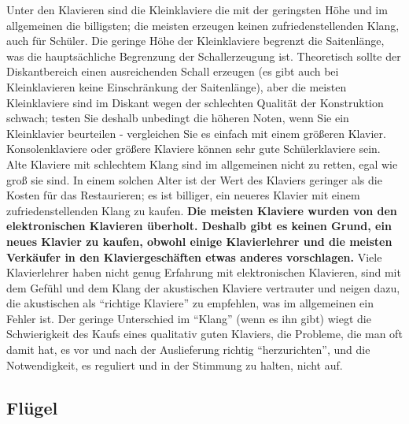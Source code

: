 Unter den Klavieren sind die Kleinklaviere die mit der geringsten Höhe und im allgemeinen die billigsten; die meisten erzeugen keinen zufriedenstellenden Klang, auch für Schüler.
Die geringe Höhe der Kleinklaviere begrenzt die Saitenlänge, was die hauptsächliche Begrenzung der Schallerzeugung ist.
Theoretisch sollte der Diskantbereich einen ausreichenden Schall erzeugen (es gibt auch bei Kleinklavieren keine Einschränkung der Saitenlänge), aber die meisten Kleinklaviere sind im Diskant wegen der schlechten Qualität der Konstruktion schwach; testen Sie deshalb unbedingt die höheren Noten, wenn Sie ein Kleinklavier beurteilen - vergleichen Sie es einfach mit einem größeren Klavier.
Konsolenklaviere oder größere Klaviere können sehr gute Schülerklaviere sein.
Alte Klaviere mit schlechtem Klang sind im allgemeinen nicht zu retten, egal wie groß sie sind.
In einem solchen Alter ist der Wert des Klaviers geringer als die Kosten für das Restaurieren; es ist billiger, ein neueres Klavier mit einem zufriedenstellenden Klang zu kaufen.
\textbf{Die meisten Klaviere wurden von den elektronischen Klavieren überholt.
Deshalb gibt es keinen Grund, ein neues Klavier zu kaufen, obwohl einige Klavierlehrer und die meisten Verkäufer in den Klaviergeschäften etwas anderes vorschlagen.}
Viele Klavierlehrer haben nicht genug Erfahrung mit elektronischen Klavieren, sind mit dem Gefühl und dem Klang der akustischen Klaviere vertrauter und neigen dazu, die akustischen als \enquote{richtige Klaviere} zu empfehlen, was im allgemeinen ein Fehler ist.
Der geringe Unterschied im \enquote{Klang} (wenn es ihn gibt) wiegt die Schwierigkeit des Kaufs eines qualitativ guten Klaviers, die Probleme, die man oft damit hat, es vor und nach der Auslieferung richtig \enquote{herzurichten}, und die Notwendigkeit, es reguliert und in der Stimmung zu halten, nicht auf.


\subsection{Flügel}\hypertarget{c1iii17d}{}

